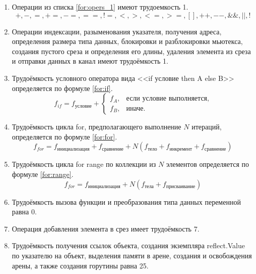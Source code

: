 \begin{enumerate}
	\item Операции из списка \ref{for:opers_1} имеют трудоемкость 1.
	\begin{equation}
		\label{for:opers_1}
		+, -, =, +=, -=, ==, !=, <, >, <=, >=, [], ++, {-}-, \&\&, ||, !
	\end{equation}

	\item Операции индексации, разыменования указателя, получения адреса, определения размера типа данных, блокировки и разблокировки мьютекса, создания пустого среза и определения его длины, удаления элемента из среза и отправки данных в канал имеют трудоёмкость 1.
	
	\item Трудоёмкость условного оператора вида <<if условие then A else B>> определяется по формуле \ref{for:if}.
	\begin{equation}
		\label{for:if}
		f_{if} = f_{\text{условие}} +
		\begin{cases}
			f_A, & \text{если условие выполняется,}\\
			f_B, & \text{иначе.}
		\end{cases}
	\end{equation}

	\item Трудоёмкость цикла for, предполагающего выполнение $N$ итераций, определяется по формуле \ref{for:for}.
	\begin{equation}
		\label{for:for}
		f_{for} = f_{\text{инициализация}} + f_{\text{сравнение}} + N(f_{\text{тело}} + f_{\text{инкремент}} + f_{\text{сравнение}})
	\end{equation}
	
	\item Трудоёмкость цикла for range по коллекции из $N$ элементов определяется по формуле \ref{for:range}.
	\begin{equation}
		\label{for:range}
		f_{for} = f_{\text{инициализация}} + N(f_{\text{тела}} + f_{\text{присваивание}})
	\end{equation}
	
	\item Трудоёмкость вызова функции и преобразования типа данных переменной равна 0.
	
	\item Операция добавления элемента в срез имеет трудоёмкость 7.
	
	\item Трудоёмкость получения ссылок объекта, создания экземпляра reflect.Value по указателю на объект, выделения памяти в арене, создания и освобождения арены, а также создания горутины равна 25.
\end{enumerate}



